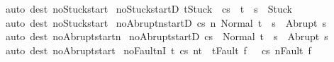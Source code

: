 \begin{isabellebody}
\ {\isacharparenleft}auto\ dest{\isacharcolon}\ noStuck{\isacharunderscore}start{\isacharparenright}%
\endisatagproof
{\isafoldproof}%
%
\isadelimproof
\isanewline
%
\endisadelimproof
\isanewline
{}\isamarkupfalse%
\ noStuck{\isacharunderscore}startD{\isacharprime}{\isacharcolon}\ {\isachardoublequoteopen}t{\isasymnoteq}Stuck\ {\isasymLongrightarrow}\ {\isasymGamma}{\isasymturnstile}{\isasymlangle}c{\isacharcomma}s{\isasymrangle}\ {\isasymRightarrow}\ t\ {\isasymLongrightarrow}\ s\ {\isasymnoteq}\ Stuck{\isachardoublequoteclose}\isanewline
%
\isadelimproof
\ \ %
\endisadelimproof
%
\isatagproof
{}\isamarkupfalse%
\ {\isacharparenleft}auto\ dest{\isacharcolon}\ noStuck{\isacharunderscore}start{\isacharparenright}%
\endisatagproof
{\isafoldproof}%
%
\isadelimproof
\isanewline
%
\endisadelimproof
\isanewline
{}\isamarkupfalse%
\ noAbruptn{\isacharunderscore}startD{\isacharcolon}\ {\isachardoublequoteopen}{\isasymGamma}{\isasymturnstile}{\isasymlangle}c{\isacharcomma}s{\isasymrangle}\ {\isacharequal}n{\isasymRightarrow}\ Normal\ t\ {\isasymLongrightarrow}\ s\ {\isasymnoteq}\ Abrupt\ s{\isacharprime}{\isachardoublequoteclose}\isanewline
%
\isadelimproof
\ \ %
\endisadelimproof
%
\isatagproof
{}\isamarkupfalse%
\ {\isacharparenleft}auto\ dest{\isacharcolon}\ noAbrupt{\isacharunderscore}startn{\isacharparenright}%
\endisatagproof
{\isafoldproof}%
%
\isadelimproof
\isanewline
%
\endisadelimproof
\isanewline
{}\isamarkupfalse%
\ noAbrupt{\isacharunderscore}startD{\isacharcolon}\ {\isachardoublequoteopen}{\isasymGamma}{\isasymturnstile}{\isasymlangle}c{\isacharcomma}s{\isasymrangle}\ {\isasymRightarrow}\ Normal\ t\ {\isasymLongrightarrow}\ s\ {\isasymnoteq}\ Abrupt\ s{\isacharprime}{\isachardoublequoteclose}\isanewline
%
\isadelimproof
\ \ %
\endisadelimproof
%
\isatagproof
{}\isamarkupfalse%
\ {\isacharparenleft}auto\ dest{\isacharcolon}\ noAbrupt{\isacharunderscore}start{\isacharparenright}%
\endisatagproof
{\isafoldproof}%
%
\isadelimproof
\isanewline
%
\endisadelimproof
\isanewline
{}\isamarkupfalse%
\ noFaultnI{\isacharcolon}\ {\isachardoublequoteopen}{\isasymlbrakk}{\isasymAnd}t{\isachardot}\ {\isasymGamma}{\isasymturnstile}{\isasymlangle}c{\isacharcomma}s{\isasymrangle}\ {\isacharequal}n{\isasymRightarrow}t\ {\isasymLongrightarrow}\ t{\isasymnoteq}Fault\ f{\isasymrbrakk}\ {\isasymLongrightarrow}\ \ {\isasymGamma}{\isasymturnstile}{\isasymlangle}c{\isacharcomma}s{\isasymrangle}\ {\isacharequal}n{\isasymRightarrow}{\isasymnotin}{\isacharbraceleft}Fault\ f{\isacharbraceright}{\isachardoublequoteclose}\ \isanewline

\end{isabellebody}
